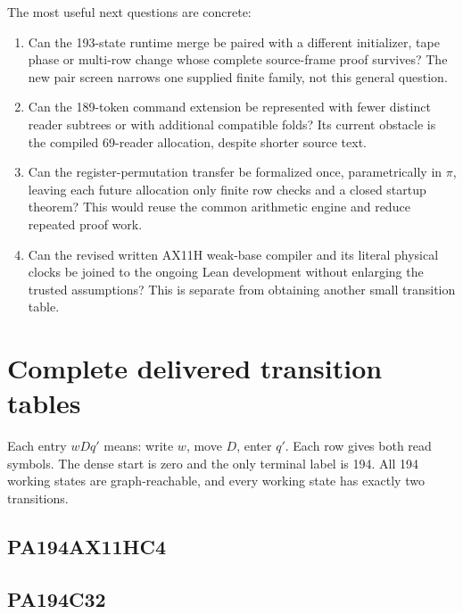 \documentclass[11pt,letterpaper]{article}
\begin{document}
The most useful next questions are concrete:
\begin{enumerate}
\item Can the 193-state runtime merge be paired with a different initializer, tape phase or multi-row change whose complete source-frame proof survives? The new pair screen narrows one supplied finite family, not this general question.
\item Can the 189-token command extension be represented with fewer distinct reader subtrees or with additional compatible folds? Its current obstacle is the compiled 69-reader allocation, despite shorter source text.
\item Can the register-permutation transfer be formalized once, parametrically in $\pi$, leaving each future allocation only finite row checks and a closed startup theorem? This would reuse the common arithmetic engine and reduce repeated proof work.
\item Can the revised written AX11H weak-base compiler and its literal physical clocks be joined to the ongoing Lean development without enlarging the trusted assumptions? This is separate from obtaining another small transition table.
\end{enumerate}

\appendix
\section{Complete delivered transition tables}\label{sec:tables}

Each entry $wDq'$ means: write $w$, move $D$, enter $q'$. Each row gives both read symbols. The dense start is zero and the only terminal label is 194. All 194 working states are graph-reachable, and every working state has exactly two transitions.

\subsection{PA194AX11HC4}


\clearpage
\subsection{PA194C32}

\end{document}
